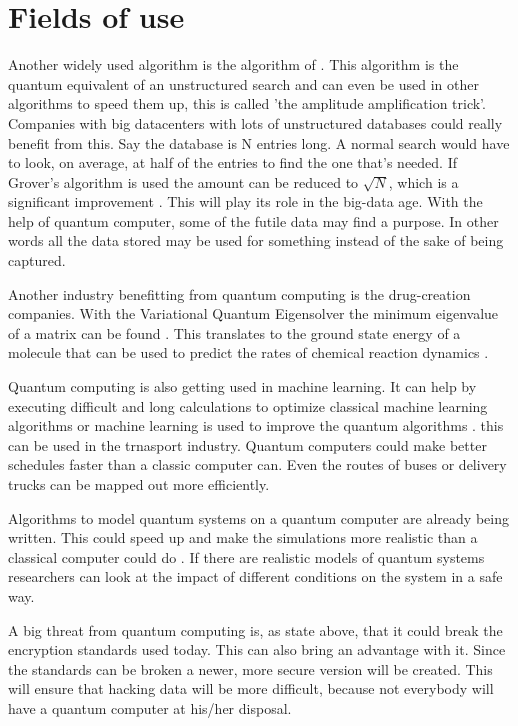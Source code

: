 \section{Fields of use}
\label{sec:Fields of use}
Another widely used algorithm is the algorithm of \textcite{grover}.
This algorithm is the quantum equivalent of an unstructured search and can even be used in other algorithms to speed them up, this is called 'the amplitude amplification trick'.
Companies with big datacenters with lots of unstructured databases could really benefit from this. Say the database is N entries long. A normal search would have to look, on average, at half of the entries to find the one that's needed.
If Grover's algorithm is used the amount can be reduced to $\sqrt{N}$, which is a significant improvement \autocite{qiskitgrover}.
This will play its role in the big-data age. With the help of quantum computer, some of the futile data may find a purpose. In other words all the data stored may be used for something instead of the sake of being captured.

Another industry benefitting from quantum computing is the drug-creation companies.
With the Variational Quantum Eigensolver the minimum eigenvalue of a matrix can be found \autocite{simmol}. This translates to the ground state energy of a molecule that can be used to predict the rates of chemical reaction dynamics \autocite{chem}.

Quantum computing is also getting used in machine learning. It can help by executing difficult and long calculations to optimize classical machine learning algorithms or machine learning is used to improve the quantum algorithms \autocite{qml}.
this can be used in the trnasport industry. Quantum computers could make better schedules faster than a classic computer can. Even the routes of buses or delivery trucks can be mapped out more efficiently.

Algorithms to model quantum systems on a quantum computer are already being written. This could speed up and make the simulations more realistic than a classical computer could do \autocite{simulations}.
If there are realistic models of quantum systems researchers can look at the impact of different conditions on the system in a safe way.

A big threat from quantum computing is, as state above, that it could break the encryption standards used today. This can also bring an advantage with it. Since the standards can be broken a newer, more secure version will be created.
This will ensure that hacking data will be more difficult, because not everybody will have a quantum computer at his/her disposal.

